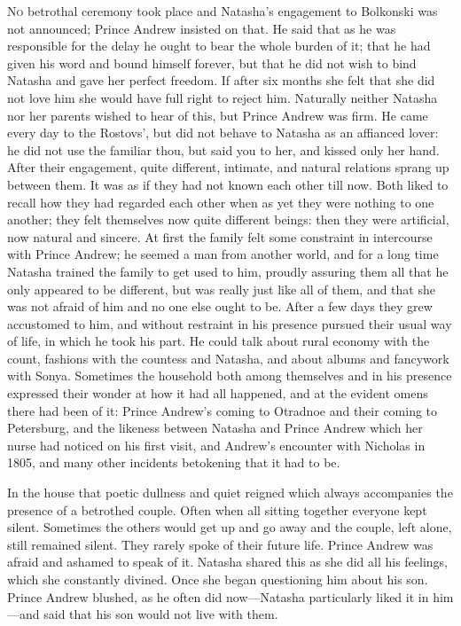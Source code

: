 \lettrine[lines=2, loversize=0.3, lraise=0]{\initfamily N}{o}
betrothal ceremony took place and Natasha's engagement to
Bolkonski was not announced; Prince Andrew insisted on that. He
said that as he was responsible for the delay he ought to bear
the whole burden of it; that he had given his word and bound
himself forever, but that he did not wish to bind Natasha and
gave her perfect freedom. If after six months she felt that she
did not love him she would have full right to reject
him. Naturally neither Natasha nor her parents wished to hear of
this, but Prince Andrew was firm. He came every day to the
Rostovs', but did not behave to Natasha as an affianced lover: he
did not use the familiar thou, but said you to her, and kissed
only her hand. After their engagement, quite different, intimate,
and natural relations sprang up between them. It was as if they
had not known each other till now. Both liked to recall how they
had regarded each other when as yet they were nothing to one
another; they felt themselves now quite different beings: then
they were artificial, now natural and sincere. At first the
family felt some constraint in intercourse with Prince Andrew; he
seemed a man from another world, and for a long time Natasha
trained the family to get used to him, proudly assuring them all
that he only appeared to be different, but was really just like
all of them, and that she was not afraid of him and no one else
ought to be. After a few days they grew accustomed to him, and
without restraint in his presence pursued their usual way of
life, in which he took his part. He could talk about rural
economy with the count, fashions with the countess and Natasha,
and about albums and fancywork with Sonya. Sometimes the
household both among themselves and in his presence expressed
their wonder at how it had all happened, and at the evident omens
there had been of it: Prince Andrew's coming to Otradnoe and
their coming to Petersburg, and the likeness between Natasha and
Prince Andrew which her nurse had noticed on his first visit, and
Andrew's encounter with Nicholas in 1805, and many other
incidents betokening that it had to be.

In the house that poetic dullness and quiet reigned which always
accompanies the presence of a betrothed couple. Often when all
sitting together everyone kept silent. Sometimes the others would
get up and go away and the couple, left alone, still remained
silent. They rarely spoke of their future life. Prince Andrew was
afraid and ashamed to speak of it. Natasha shared this as she did
all his feelings, which she constantly divined. Once she began
questioning him about his son. Prince Andrew blushed, as he often
did now---Natasha particularly liked it in him---and said that
his son would not live with them.

